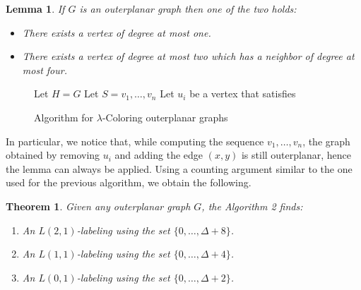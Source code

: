 \documentclass[12pt,a4paper]{article}
\newtheorem{lemma}{Lemma}
\newtheorem{theorem}{Theorem}
\begin{document}
	\begin{lemma}
		\label{lemma_outer}
		If $G$ is an outerplanar graph then one of the two holds:
		\begin{itemize}
			\item There exists a vertex of degree at most one.
			\item There exists a vertex of degree at most two which
			has a neighbor of degree at most four.
		\end{itemize}
	\end{lemma}

	\begin{figure}[H]
		\begin{algorithmic}[1]
				\State Let $H = G$
				\State Let $S = v_1, \ldots, v_n$
					\State Let $u_i$ be a vertex that satisfies 
					\EndIf
				\EndFor
				\EndFor
			\EndFunction
		\end{algorithmic}

		\caption{Algorithm for $\lambda$-Coloring outerplanar graphs}
	\end{figure}

	In particular, we notice that, while computing the sequence $v_1, \ldots, v_n$, the graph obtained by removing $u_i$ and adding the edge $(x,y)$ is still outerplanar, hence the lemma can always be applied. Using a counting argument similar to the one used for the previous algorithm, we obtain the following.

	\begin{theorem}
		Given any outerplanar graph $G$, the Algorithm 2 finds:
		\begin{enumerate}
			\item An $L(2, 1)$-labeling using the set $\{0, \ldots, \Delta + 8\}$.
			\item An $L(1, 1)$-labeling using the set $\{0, \ldots, \Delta + 4\}$.
			\item An $L(0, 1)$-labeling using the set $\{0, \ldots, \Delta + 2\}$.
		\end{enumerate}
	\end{theorem}
\end{document}
